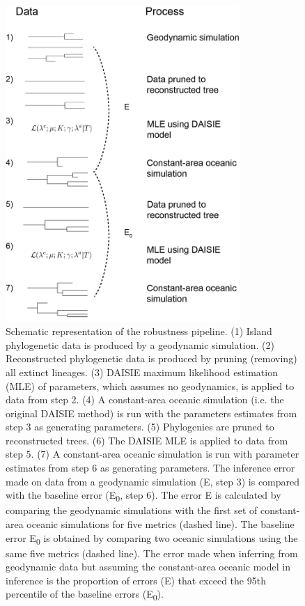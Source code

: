 \documentclass{article}
\begin{document}
\clearpage

\begin{figure}
    \centering
    \includegraphics[height=12cm]{pipeline.png}
    \caption{Schematic representation of the robustness pipeline. (1) Island phylogenetic data is produced by a geodynamic simulation. (2) Reconstructed phylogenetic data is produced by pruning (removing) all extinct lineages. (3) DAISIE maximum likelihood estimation (MLE) of parameters, which assumes no geodynamics, is applied to data from step 2. (4) A constant-area oceanic simulation (i.e. the original DAISIE method) is run with the parameters estimates from step 3 as generating parameters. (5) Phylogenies are pruned to reconstructed trees. (6) The DAISIE MLE is applied to data from step 5. (7) A constant-area oceanic simulation is run with parameter estimates from step 6 as generating parameters. The inference error made on data from a geodynamic simulation (E, step 3) is compared with the baseline error (E\textsubscript{0}, step 6). The error E is calculated by comparing the geodynamic simulations with the first set of constant-area oceanic simulations for five metrics (dashed line). The baseline error E\textsubscript{0} is obtained by comparing two oceanic simulations using the same five metrics (dashed line). The error made when inferring from geodynamic data but assuming the constant-area oceanic model in inference is the proportion of errors (E) that exceed the 95th percentile of the baseline errors (E\textsubscript{0}).}
    \label{fig:pipeline}
\end{figure}
\end{document}
